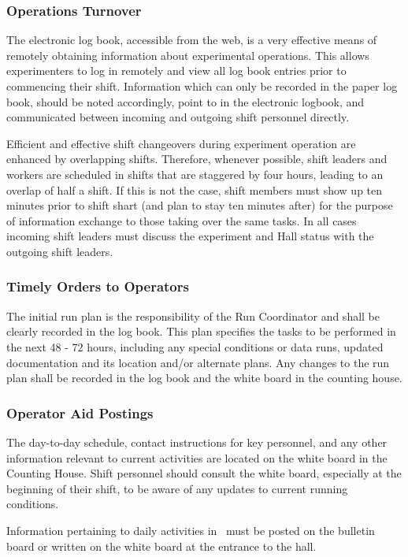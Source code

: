 \documentclass[10pt]{article}
\begin{document}
\subsubsection{Operations Turnover}
The electronic log book, accessible from the web, is a very effective means 
of remotely obtaining information about experimental operations. This allows 
experimenters to log in remotely and view all log book 
entries prior to commencing their shift.
Information which can only be recorded in the paper log book, should be
noted accordingly, point to in the electronic logbook, and communicated between incoming and outgoing shift 
personnel directly.

Efficient and effective shift changeovers during experiment operation 
are enhanced by overlapping shifts. Therefore, whenever possible, shift leaders 
and workers are scheduled in shifts that are staggered by four hours, leading 
to an overlap of half a shift.  If this is not the case, shift members must show
up ten minutes prior to shift shart (and plan to stay ten minutes after) for the
purpose of information exchange to those taking over the same tasks.
In all cases incoming shift leaders must discuss the experiment and Hall status with the
outgoing shift leaders.

\subsubsection{Timely Orders to Operators}
The initial run plan is the responsibility of the Run Coordinator and
shall be clearly recorded in the log book. This plan specifies
the tasks to be performed in the next 48 - 72 hours, including
any special conditions or data runs, updated documentation and its
location and/or alternate plans. Any changes to the run plan shall
be recorded in the log book and the white board in the counting house.

\subsubsection{Operator Aid Postings}
The day-to-day schedule, contact instructions for key personnel, and 
any other information relevant to current activities are located
on the white board in the Counting House. Shift personnel should
consult the white board, especially at the beginning
of their shift, to be aware of any updates to current running conditions.

Information pertaining to daily activities in \HALL\ must be posted on the 
bulletin board or written on the white board at the entrance to the hall.
\end{document}
